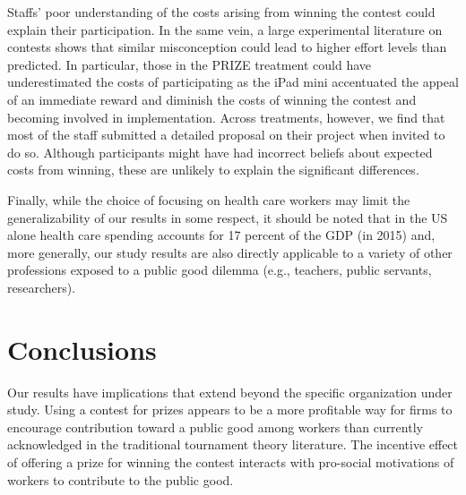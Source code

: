 \documentclass[12pt, titlepage]{article}
\begin{document}
Staffs' poor understanding of the costs arising from winning the contest
could explain their participation. In the same vein, a large
experimental literature on contests \citep{dechenaux2014survey} shows
that similar misconception could lead to higher effort levels than
predicted. In particular, those in the PRIZE treatment could have
underestimated the costs of participating as the iPad mini accentuated
the appeal of an immediate reward and diminish the costs of winning the
contest and becoming involved in implementation. Across treatments,
however, we find that most of the staff submitted a detailed proposal on
their project when invited to do so. Although participants might have
had incorrect beliefs about expected costs from winning, these are
unlikely to explain the significant differences.

Finally, while the choice of focusing on health care workers may limit
the generalizability of our results in some respect, it should be noted
that in the US alone health care spending accounts for 17 percent of the
GDP (in 2015) and, more generally, our study results are also directly
applicable to a variety of other professions exposed to a public good
dilemma (e.g., teachers, public servants, researchers).

\section{Conclusions}\label{conclusions}

Our results have implications that extend beyond the specific
organization under study. Using a contest for prizes appears to be a
more profitable way for firms to encourage contribution toward a public
good among workers than currently acknowledged in the traditional
tournament theory literature. The incentive effect of offering a prize
for winning the contest interacts with pro-social motivations of workers
to contribute to the public good.

\renewcommand\refname{References}

\end{document}
